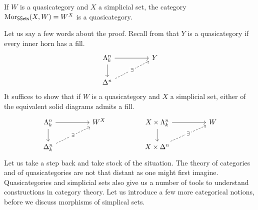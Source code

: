 \begin{theorem}[Joyal]\label{thm: simplical set maps are quasicategories}
  If $W$ is a quasicategory and $X$ a simplicial set, the category $\mathrm{Mor}_{\mathsf{SSets}}(X,W)=W^{X}$ is a quasicategory. 
\end{theorem}
Let us say a few words about the proof. Recall from  that $Y$ is a quasicategory if every inner horn has a fill.
$$%
\begin{tikzcd}
	{\Lambda^{n}_{k}} && Y \\
	{\Delta^{n}}
	\arrow[from=1-1, to=2-1]
	\arrow[from=1-1, to=1-3]
	\arrow["\exists"{description}, dashed, from=2-1, to=1-3]
\end{tikzcd}$$
It suffices to show that if $W$ is a quasicategory and $X$ a simplicial set, either of the equivalent solid diagrams admits a fill. 
$$%
\begin{tikzcd}
	{\Lambda^{n}_{k}} && {W^{X}} && {X\times\Lambda^{n}_{k}} && W \\
	{\Delta^{n}_{k}} &&&& {X\times\Delta^{n}}
	\arrow[from=1-1, to=1-3]
	\arrow[from=1-1, to=2-1]
	\arrow["\exists"{description}, dashed, from=2-1, to=1-3]
	\arrow[from=1-5, to=1-7]
	\arrow[from=1-5, to=2-5]
	\arrow["\exists"{description}, dashed, from=2-5, to=1-7]
\end{tikzcd}$$
Let us take a step back and take stock of the situation. The theory of categories and of quasicategories are not that distant as one might first imagine. Quasicategories and simplicial sets also give us a number of tools to understand constructions in category theory. Let us introduce a few more categorical notions, before we discuss morphisms of simplical sets. 
